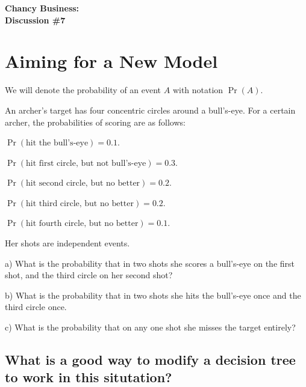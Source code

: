 \documentclass[12pt]{amsart}
\theoremstyle{definition}
\begin{document}
\begin{center}
\textbf{\Huge
Chancy Business:\\ Discussion \#7
}
\end{center}


\vspace{.5in}

\section*{Aiming for a New Model}
We will denote the probability of an event $A$ with notation $\Pr(A)$.

An archer's target has four concentric circles around a bull's-eye. For a certain archer, the probabilities of scoring are as follows:
\begin{compactitem}
\item $\Pr(\text{hit the bull's-eye}) = 0.1$.
\item $\Pr(\text{hit first circle, but not bull's-eye}) = 0.3$.
\item $\Pr(\text{hit second circle, but no better}) = 0.2$.
\item $\Pr(\text{hit third circle, but no better}) = 0.2$.
\item $\Pr(\text{hit fourth circle, but no better}) = 0.1$.
\end{compactitem}
Her shots are independent events.
\vspace{1in}
\begin{compactitem}
\item[a)] What is the probability that in two shots she scores a bull's-eye on the first shot, and the third circle on her second shot?
\vspace{.5in}
\item[b)] What is the probability that in two shots she hits the bull's-eye once and the third circle once.
\vspace{.5in}
\item[c)] What is the probability that on any one shot she misses the target entirely?
\end{compactitem}

\vspace{.5in}

\subsection*{What is a good way to modify a decision tree to work in this situtation?}
\end{document}
